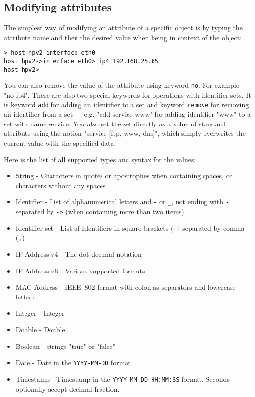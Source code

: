 \documentclass[deska]{subfiles}
\begin{document}
\subsection{Modifying attributes}

The simplest way of modifying an attribute of a specific object is by typing the attribute name and then the desired value
when being in context of the object:

\begin{verbatim}
> host hpv2 interface eth0
host hpv2->interface eth0> ip4 192.168.25.65
host hpv2>
\end{verbatim}

You can also remove the value of the attribute using keyword {\tt no}. For example "no ip4". There are also two special
keywords for operations with identifier sets. It is keyword {\tt add} for adding an identifier to a set and keyword
{\tt remove} for removing an identifier from a set --- e.g. "add service www" for adding identifier "www" to a set
with name service. You also set the set directly as a value of standard attribute using the notion "service [ftp, www,
dns]", which simply overwrites the current value with the specified data.

Here is the list of all supported types and syntax for the values:

\begin{itemize}
    \item{String} - Characters in quotes or apostrophes when containing spaces, or characters without any spaces
    \item{Identifier} - List of alphanumerical letters and {\tt -} or {\tt \_}, not ending with {\tt -}, separated by
        {\tt ->} (when containing more than two items)
    \item{Identifier set} - List of Identifiers in square brackets ({\tt []} separated by comma ({\tt ,})
    \item{IP Address v4} - The dot-decimal notation~\cite{ipv4-dot-decimal}
    \item{IP Address v6} - Various supported formats~\cite{rfc5952}
    \item{MAC Address} - IEEE~802 format with colon as separators and lowercase letters
    \item{Integer} - Integer
    \item{Double} - Double
    \item{Boolean} - strings "true" or "false"
    \item{Date} - Date in the {\tt YYYY-MM-DD} format
    \item{Timestamp} - Timestamp in the {\tt YYYY-MM-DD HH:MM:SS} format.  Seconds optionally accept decimal fraction.
\end{itemize}
\end{document}
